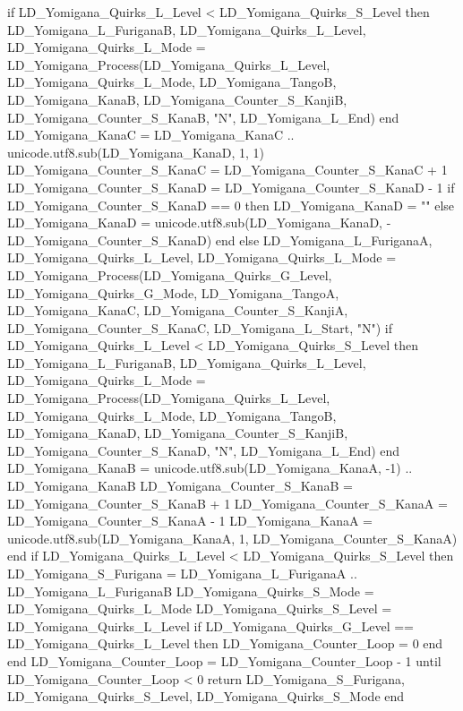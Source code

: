 {				if LD_Yomigana_Quirks_L_Level < LD_Yomigana_Quirks_S_Level then 
					LD_Yomigana_L_FuriganaB, LD_Yomigana_Quirks_L_Level, LD_Yomigana_Quirks_L_Mode = LD_Yomigana_Process(LD_Yomigana_Quirks_L_Level, LD_Yomigana_Quirks_L_Mode, LD_Yomigana_TangoB, LD_Yomigana_KanaB, LD_Yomigana_Counter_S_KanjiB, LD_Yomigana_Counter_S_KanaB, "N", LD_Yomigana_L_End) 
				end
				LD_Yomigana_KanaC =  LD_Yomigana_KanaC .. unicode.utf8.sub(LD_Yomigana_KanaD, 1, 1) 
				LD_Yomigana_Counter_S_KanaC = LD_Yomigana_Counter_S_KanaC + 1
				LD_Yomigana_Counter_S_KanaD = LD_Yomigana_Counter_S_KanaD - 1
				if LD_Yomigana_Counter_S_KanaD == 0 then
					LD_Yomigana_KanaD = ""
				else
					LD_Yomigana_KanaD = unicode.utf8.sub(LD_Yomigana_KanaD, -LD_Yomigana_Counter_S_KanaD)
				end	
			else
				LD_Yomigana_L_FuriganaA, LD_Yomigana_Quirks_L_Level, LD_Yomigana_Quirks_L_Mode = LD_Yomigana_Process(LD_Yomigana_Quirks_G_Level, LD_Yomigana_Quirks_G_Mode, LD_Yomigana_TangoA, LD_Yomigana_KanaC, LD_Yomigana_Counter_S_KanjiA, LD_Yomigana_Counter_S_KanaC, LD_Yomigana_L_Start, "N") 
				if LD_Yomigana_Quirks_L_Level < LD_Yomigana_Quirks_S_Level then 
					LD_Yomigana_L_FuriganaB, LD_Yomigana_Quirks_L_Level, LD_Yomigana_Quirks_L_Mode = LD_Yomigana_Process(LD_Yomigana_Quirks_L_Level, LD_Yomigana_Quirks_L_Mode, LD_Yomigana_TangoB, LD_Yomigana_KanaD, LD_Yomigana_Counter_S_KanjiB, LD_Yomigana_Counter_S_KanaD, "N", LD_Yomigana_L_End) 
				end
				LD_Yomigana_KanaB = unicode.utf8.sub(LD_Yomigana_KanaA, -1) ..  LD_Yomigana_KanaB
				LD_Yomigana_Counter_S_KanaB = LD_Yomigana_Counter_S_KanaB + 1
				LD_Yomigana_Counter_S_KanaA = LD_Yomigana_Counter_S_KanaA - 1
				LD_Yomigana_KanaA = unicode.utf8.sub(LD_Yomigana_KanaA, 1, LD_Yomigana_Counter_S_KanaA)
			end
			if LD_Yomigana_Quirks_L_Level < LD_Yomigana_Quirks_S_Level then
				LD_Yomigana_S_Furigana = LD_Yomigana_L_FuriganaA .. LD_Yomigana_L_FuriganaB
				LD_Yomigana_Quirks_S_Mode = LD_Yomigana_Quirks_L_Mode
				LD_Yomigana_Quirks_S_Level = LD_Yomigana_Quirks_L_Level
				if LD_Yomigana_Quirks_G_Level == LD_Yomigana_Quirks_L_Level then
					LD_Yomigana_Counter_Loop = 0 %
				end
			end
			LD_Yomigana_Counter_Loop = LD_Yomigana_Counter_Loop  - 1
		until LD_Yomigana_Counter_Loop < 0			
		return LD_Yomigana_S_Furigana, LD_Yomigana_Quirks_S_Level, LD_Yomigana_Quirks_S_Mode
	end                                                    
	
}
